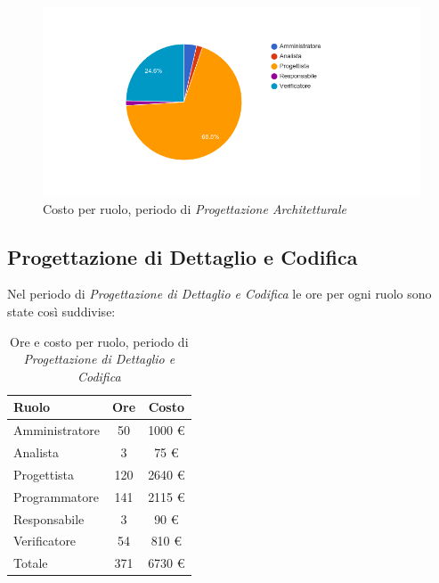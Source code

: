 \begin{figure}[H]
  \begin{center}
    \includegraphics[width=15cm]{res/img/prospettoEconomico/costoPerRuoloProgettazioneArchitetturale.png}
  \caption{Costo per ruolo, periodo di \textit{Progettazione Architetturale}}
  \end{center} 
\end{figure}  


\subsection{Progettazione di Dettaglio e Codifica}
Nel periodo di \textit{Progettazione di Dettaglio e Codifica} le ore per ogni ruolo sono state così suddivise:

\begin{table}[H]
	\centering
	\begin{tabular}{ l c c }
		\textbf{Ruolo} & \textbf{Ore} & \textbf{Costo} \\
		\hline
		Amministratore & 50 & 1000 \euro{} \\
		Analista & 3 & 75 \euro{} \\
		Progettista & 120 & 2640 \euro{} \\
		Programmatore & 141 & 2115 \euro{} \\
		Responsabile & 3 & 90 \euro{} \\
		Verificatore & 54 & 810 \euro{} \\
		\hline
		Totale & 371 & 6730 \euro{} \\
		\hline
	\end{tabular}
	\caption{Ore e costo per ruolo, periodo di \textit{Progettazione di Dettaglio e Codifica}}
\end{table}

